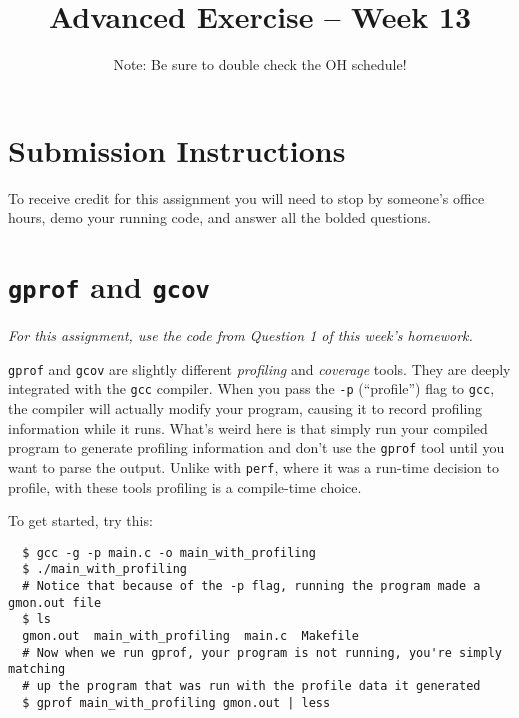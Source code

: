 \documentclass{article}
\begin{document}
\fancyfoot[C]{\color{gray} \thepage~/~\pageref*{LastPage}}
\pagestyle{fancyplain}


\title{\textbf{Advanced Exercise -- Week 13\\}}
\author{\textbf{\color{red}{Due: Before December 17, 10:00PM}}}
\date{Note: Be sure to double check the OH schedule!}
\maketitle


\section*{Submission Instructions}
To receive credit for this assignment you will need to stop by someone's
office hours, demo your running code, and answer all the bolded questions.

\section*{\texttt{gprof} and \texttt{gcov}}

\emph{For this assignment, use the code from Question 1 of this week's
  homework.}

\texttt{gprof} and \texttt{gcov} are slightly different \emph{profiling} and
\emph{coverage} tools. They are deeply integrated with the \texttt{gcc}
compiler. When you pass the \texttt{-p} (``profile'') flag to \texttt{gcc},
the compiler will actually modify your program, causing it to record profiling
information while it runs. What's weird here is that simply run your compiled
program to generate profiling information and don't use the \texttt{gprof}
tool until you want to parse the output. Unlike with \texttt{perf}, where it
was a run-time decision to profile, with these tools profiling is a
compile-time choice.

To get started, try this:
\begin{verbatim}
  $ gcc -g -p main.c -o main_with_profiling
  $ ./main_with_profiling
  # Notice that because of the -p flag, running the program made a gmon.out file
  $ ls
  gmon.out  main_with_profiling  main.c  Makefile
  # Now when we run gprof, your program is not running, you're simply matching
  # up the program that was run with the profile data it generated
  $ gprof main_with_profiling gmon.out | less
\end{verbatim}
\end{document}
